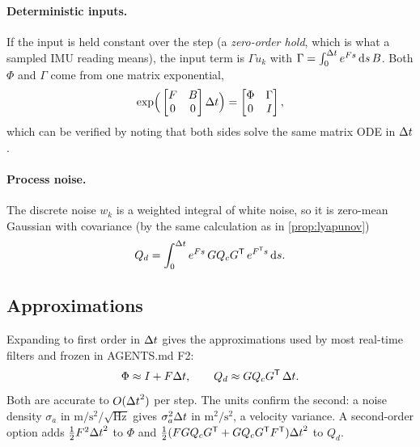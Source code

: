 \paragraph{Deterministic inputs.} If the input is held constant over the step (a \emph{zero-order hold}, which is what a sampled IMU reading
means), the input term is $\Gamma u_k$ with $\Gamma = \int_0^{\Delta t} e^{Fs}\,\mathrm{d} s\,B$. Both $\Phi$ and $\Gamma$ come from one matrix exponential,
\begin{equation}
  \exp\!\Big(\begin{bmatrix} F & B \\ 0 & 0\end{bmatrix}{\Delta t}\Big) = \begin{bmatrix} \Phi & \Gamma \\ 0 & I\end{bmatrix},
\end{equation}
which can be verified by noting that both sides solve the same matrix ODE in ${\Delta t}$.

\paragraph{Process noise.} The discrete noise $w_k$ is a weighted integral of white noise, so it is zero-mean Gaussian with covariance (by the
same calculation as in \cref{prop:lyapunov})
\begin{equation}
  Q_d = \int_0^{\Delta t} e^{Fs}\,GQ_cG^{\mathsf{T}}\,e^{F^{\mathsf{T}} s}\,\mathrm{d} s .
  \label{eq:qd-exact}
\end{equation}

\subsection{Approximations}

Expanding to first order in ${\Delta t}$ gives the approximations used by most real-time filters and frozen in AGENTS.md F2:
\begin{equation}
  \Phi \approx I + F{\Delta t}, \qquad Q_d \approx GQ_cG^{\mathsf{T}}\,{\Delta t} .
  \label{eq:disc-first-order}
\end{equation}
Both are accurate to $O({\Delta t}^2)$ per step. The units confirm the second: a noise density $\sigma_a$ in $\mathrm{m/s^2/\sqrt{Hz}}$ gives $\sigma_a^2{\Delta t}$ in
$\mathrm{m^2/s^2}$, a velocity variance. A second-order option adds $\tfrac12F^2{\Delta t}^2$ to $\Phi$ and $\tfrac12(FGQ_cG^{\mathsf{T}} + GQ_cG^{\mathsf{T}} F^{\mathsf{T}}){\Delta t}^2$ to $Q_d$.

